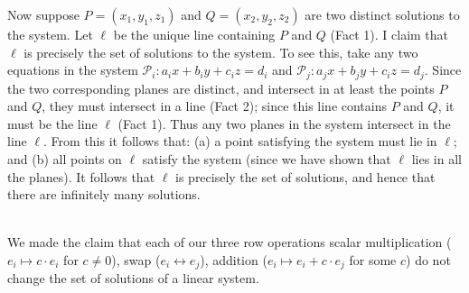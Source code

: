 \begin{solution}
Now suppose $P=(x_1,y_1,z_1)$ and $Q=(x_2,y_2,z_2)$ are two distinct solutions to the system. Let $\ell$ be the unique line containing $P$ and $Q$ (Fact 1). I claim that $\ell$ is precisely the set of solutions to the system. To see this, take any two equations in the system $\mathcal{P}_i\colon a_ix+b_iy+c_iz=d_i$ and $\mathcal{P}_j\colon a_jx+b_jy+c_iz=d_j$. Since the two corresponding planes are distinct, and intersect in at least the points $P$ and $Q$, they must intersect in a line (Fact 2); since this line contains $P$ and $Q$, it must be the line $\ell$ (Fact 1). Thus any two planes in the system intersect in the line $\ell$. From this it follows that: (a) a point satisfying the system must lie in $\ell$; and (b) all points on $\ell$ satisfy the system (since we have shown that $\ell$ lies in all the planes). It follows that $\ell$ is precisely the set of solutions, and hence that there are infinitely many solutions. 
\end{solution}
\\
\ii
\noindent
 We made the claim that each of our three row operations 
\bb[i]
\ii scalar multiplication ($e_i\mapsto c\cdot e_i$ for $c\ne 0$),
\ii swap ($e_i\leftrightarrow e_j$), 
\ii addition ($e_i\mapsto e_i+c\cdot e_j$ for some $c$) 
\ee
do not change the set of solutions of a linear system.

